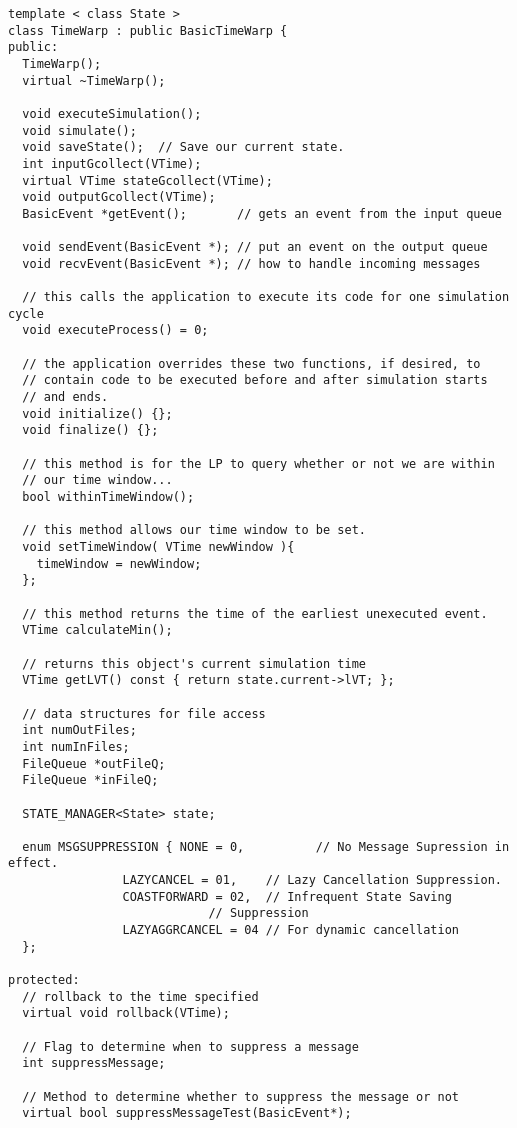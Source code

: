 \documentclass[11pt]{report}
\begin{document}
\begin{verbatim}
template < class State > 
class TimeWarp : public BasicTimeWarp {
public:
  TimeWarp();
  virtual ~TimeWarp();

  void executeSimulation();
  void simulate();
  void saveState();  // Save our current state.
  int inputGcollect(VTime);
  virtual VTime stateGcollect(VTime);
  void outputGcollect(VTime);
  BasicEvent *getEvent();       // gets an event from the input queue

  void sendEvent(BasicEvent *); // put an event on the output queue
  void recvEvent(BasicEvent *); // how to handle incoming messages

  // this calls the application to execute its code for one simulation cycle
  void executeProcess() = 0;

  // the application overrides these two functions, if desired, to
  // contain code to be executed before and after simulation starts
  // and ends.
  void initialize() {};
  void finalize() {};

  // this method is for the LP to query whether or not we are within
  // our time window...
  bool withinTimeWindow();

  // this method allows our time window to be set.
  void setTimeWindow( VTime newWindow ){
    timeWindow = newWindow;
  };

  // this method returns the time of the earliest unexecuted event.
  VTime calculateMin(); 

  // returns this object's current simulation time
  VTime getLVT() const { return state.current->lVT; };

  // data structures for file access
  int numOutFiles;
  int numInFiles;
  FileQueue *outFileQ;
  FileQueue *inFileQ;

  STATE_MANAGER<State> state;

  enum MSGSUPPRESSION { NONE = 0,          // No Message Supression in effect.
		        LAZYCANCEL = 01,    // Lazy Cancellation Suppression.
		        COASTFORWARD = 02,  // Infrequent State Saving
			 	            // Suppression
		        LAZYAGGRCANCEL = 04 // For dynamic cancellation
  };

protected:
  // rollback to the time specified
  virtual void rollback(VTime);

  // Flag to determine when to suppress a message
  int suppressMessage; 

  // Method to determine whether to suppress the message or not 
  virtual bool suppressMessageTest(BasicEvent*);


\end{verbatim}
\end{document}
